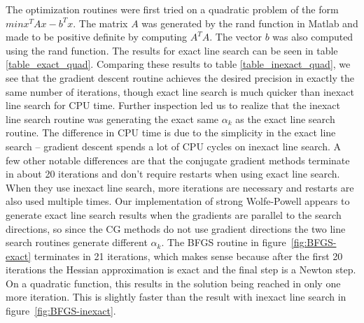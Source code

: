 \documentclass[12pt]{amsart}
\begin{document}
The optimization routines were first tried on a quadratic problem of the form $min x^T A x - b^T x $.  The matrix $A$ was generated by the rand function in Matlab and made to be positive definite by computing $A^T A$.  The vector $b$ was also computed using the rand function.  The results for exact line search can be seen in table \ref{table_exact_quad}.  Comparing these results to table \ref{table_inexact_quad}, we see that the gradient descent routine achieves the desired precision in exactly the same number of iterations, though exact line search is much quicker than inexact line search for CPU time.  Further inspection led us to realize that the inexact line search routine was generating the exact same $\alpha_k$ as the exact line search routine.  The difference in CPU time is due to the simplicity in the exact line search -- gradient descent spends a lot of CPU cycles on inexact line search.  A few other notable differences are that the conjugate gradient methods terminate in about 20 iterations and don't require restarts when using exact line search.  When they use inexact line search, more iterations are necessary and restarts are also used multiple times.  Our implementation of strong Wolfe-Powell appears to generate exact line search results when the gradients are parallel to the search directions, so since the CG methods do not use gradient directions the two line search routines generate different $\alpha_k$.  The BFGS routine in figure~\ref{fig:BFGS-exact} terminates in 21 iterations, which makes sense because after the first 20 iterations the Hessian approximation is exact and the final step is a Newton step.  On a quadratic function, this results in the solution being reached in only one more iteration.  This is slightly faster than the result with inexact line search in figure~\ref{fig:BFGS-inexact}.
\end{document}
